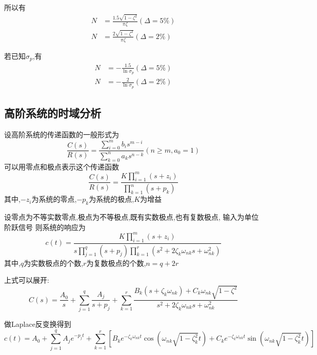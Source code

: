\documentclass[12pt,a4paper,oneside]{ctexart}
\begin{document}
所以有
\begin{align*}
    N&=\frac{1.5\sqrt{1-\zeta^2}}{\pi \zeta}(\Delta=5\%)\\
    N&=\frac{2\sqrt{1-\zeta^2}}{\pi \zeta}(\Delta=2\%)
\end{align*}

若已知$\sigma_p$,有
\begin{align*}
    N&=-\frac{1.5}{\ln{\sigma_p}}(\Delta=5\%)\\
    N&=-\frac{2}{\ln{\sigma_p}}(\Delta=2\%)
\end{align*}

\subsection{高阶系统的时域分析}
设高阶系统的传递函数的一般形式为
\[
    \frac{C(s)}{R(s)}=\frac{\sum_{i=0}^{m}b_is^{m-i}}{\sum_{k=0}^{n}a_ks^{n-k}}(n\geqslant m,a_0=1)
\]
可以用零点和极点表示这个传递函数
\[
    \frac{C(s)}{R(s)}=\frac{K\prod_{i=1}^{m}(s+z_i)}{\prod_{k=1}^{n}(s+p_k)}
\]
其中,$-z_i$为系统的零点,$-p_k$为系统的极点,$K$为增益

设零点为不等实数零点,极点为不等极点,既有实数极点,也有复数极点,
输入为单位阶跃信号
则系统的响应为
\[
    c(t)=\frac{K\prod_{i=1}^{m}(s+z_i)}{s\prod_{j=1}^{q}(s+p_j)\prod_{k=1}^{r}(s^2+2\zeta_k\omega_{nk}s+\omega_{nk}^2)}
\]
其中,$q$为实数极点的个数,$r$为复数极点的个数,$n=q+2r$

上式可以展开:
\[
    C(s)=\frac{A_0}{s}+\sum_{j=1}^q\frac{A_j}{s+p_j}+\sum_{k=1}^r\frac{B_k(s+\zeta_k\omega_{nk})+C_k\omega_{nk}\sqrt{1-\zeta^2}}{s^2+2\zeta_k\omega_{nk}s+\omega_{nk}^2}
\]

做Laplace反变换得到
\[
    c(t)=A_0+\sum_{j=1}^qA_j e^{-p_j t}+\sum_{k=1}^r\left[B_k e^{-\zeta_k\omega_{nk}t}\cos(\omega_{nk}\sqrt{1-\zeta_k^2}t)+C_k e^{-\zeta_k\omega_{nk}t}\sin(\omega_{nk}\sqrt{1-\zeta_k^2}t)\right]
\]
\end{document}
